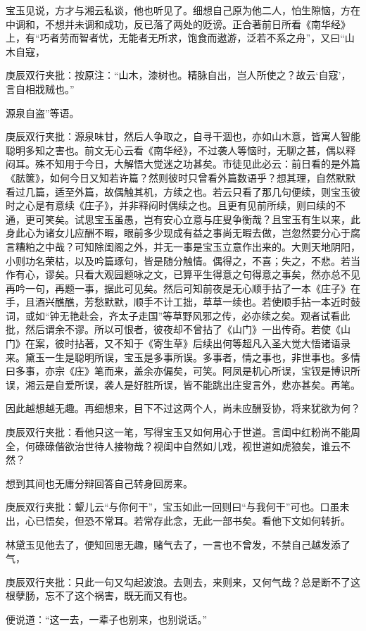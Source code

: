 \begin{parag}


    宝玉见说，方才与湘云私谈，他也听见了。细想自己原为他二人，怕生隙恼，方在中调和，不想并未调和成功，反已落了两处的贬谤。正合著前日所看《南华经》上，有“巧者劳而智者忧，无能者无所求，饱食而遨游，泛若不系之舟”，又曰“山木自寇，\begin{note}庚辰双行夹批：按原注：“山木，漆树也。精脉自出，岂人所使之？故云‘自寇’，言自相戕贼也。”\end{note}源泉自盗”等语。\begin{note}庚辰双行夹批：源泉味甘，然后人争取之，自寻干涸也，亦如山木意，皆寓人智能聪明多知之害也。前文无心云看《南华经》，不过袭人等恼时，无聊之甚，偶以释闷耳。殊不知用于今日，大解悟大觉迷之功甚矣。市徒见此必云：前日看的是外篇《胠箧》，如何今日又知若许篇？然则彼时只曾看外篇数语乎？想其理，自然默默看过几篇，适至外篇，故偶触其机，方续之也。若云只看了那几句便续，则宝玉彼时之心是有意续《庄子》，并非释闷时偶续之也。且更有见前所续，则曰续的不通，更可笑矣。试思宝玉虽愚，岂有安心立意与庄叟争衡哉？且宝玉有生以来，此身此心为诸女儿应酬不暇，眼前多少现成有益之事尚无暇去做，岂忽然要分心于腐言糟粕之中哉？可知除闺阁之外，并无一事是宝玉立意作出来的。大则天地阴阳，小则功名荣枯，以及吟篇琢句，皆是随分触情。偶得之，不喜；失之，不悲。若当作有心，谬矣。只看大观园题咏之文，已算平生得意之句得意之事矣，然亦总不见再吟一句，再题一事，据此可见矣。然后可知前夜是无心顺手拈了一本《庄子》在手，且酒兴醮醮，芳愁默默，顺手不计工拙，草草一续也。若使顺手拈一本近时鼓词，或如“钟无艳赴会，齐太子走国”等草野风邪之传，必亦续之矣。观者试看此批，然后谓余不谬。所以可恨者，彼夜却不曾拈了《山门》一出传奇。若使《山门》在案，彼时拈著，又不知于《寄生草》后续出何等超凡入圣大觉大悟诸语录来。黛玉一生是聪明所误，宝玉是多事所误。多事者，情之事也，非世事也。多情曰多事，亦宗《庄》笔而来，盖余亦偏矣，可笑。阿凤是机心所误，宝钗是博识所误，湘云是自爱所误，袭人是好胜所误，皆不能跳出庄叟言外，悲亦甚矣。再笔。\end{note}因此越想越无趣。再细想来，目下不过这两个人，尚未应酬妥协，将来犹欲为何？\begin{note}庚辰双行夹批：看他只这一笔，写得宝玉又如何用心于世道。言闺中红粉尚不能周全，何碌碌偕欲治世待人接物哉？视闺中自然如儿戏，视世道如虎狼矣，谁云不然？\end{note}想到其间也无庸分辩回答自己转身回房来。\begin{note}庚辰双行夹批：颦儿云“与你何干”，宝玉如此一回则曰“与我何干”可也。口虽未出，心已悟矣，但恐不常耳。若常存此念，无此一部书矣。看他下文如何转折。\end{note}林黛玉见他去了，便知回思无趣，赌气去了，一言也不曾发，不禁自己越发添了气，\begin{note}庚辰双行夹批：只此一句又勾起波浪。去则去，来则来，又何气哉？总是断不了这根孽肠，忘不了这个祸害，既无而又有也。\end{note}便说道：“这一去，一辈子也别来，也别说话。”
\end{parag}


